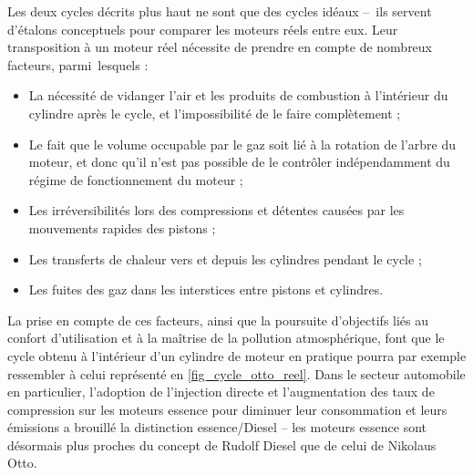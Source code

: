 		Les deux cycles décrits plus haut ne sont que des cycles idéaux --\ ils servent d’étalons conceptuels pour comparer les moteurs réels entre eux. Leur transposition à un moteur réel nécessite de prendre en compte de nombreux facteurs, parmi~lesquels :
		\begin{itemize}
			\item La nécessité de vidanger l’air et les produits de combustion à l’intérieur du cylindre après le cycle, et l’impossibilité de le faire complètement ;
			\item Le fait que le volume occupable par le gaz soit lié à la rotation de l’arbre du moteur, et donc qu’il n’est pas possible de le contrôler indépendamment du régime de fonctionnement du moteur ;
			\item Les irréversibilités lors des compressions et détentes causées par les mouvements rapides des pistons ;
			\item Les transferts de chaleur vers et depuis les cylindres pendant le cycle ;
			\item Les fuites des gaz dans les interstices entre pistons et cylindres.
		\end{itemize}

		La prise en compte de ces facteurs, ainsi que la poursuite d’objectifs liés au confort d’utilisation et à la maîtrise de la pollution atmosphérique, font que le cycle obtenu à l’intérieur d’un cylindre de moteur en pratique pourra par exemple ressembler à celui représenté en \cref{fig_cycle_otto_reel}. Dans le secteur automobile en particulier, l’adoption de l’injection directe et l’augmentation des taux de compression sur les moteurs essence pour diminuer leur consommation et leurs émissions a brouillé la distinction essence/Diesel -- les moteurs essence sont désormais plus proches du concept de Rudolf Diesel que de celui de Nikolaus Otto.

